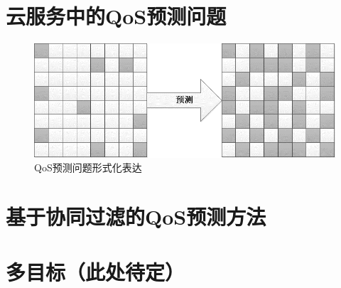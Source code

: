 		\section{云服务中的QoS预测问题}
		\label{sec_QoS_Prediction_in_the_Cloud}
		\begin{figure}[htb]
			\centering
			\includegraphics[scale=0.5]{fig/related_work/QoS_Prediction_Visualization.png}
			\caption{QoS预测问题形式化表达}
			\label{fig_QoS_Prediction_Visualization}
			\centering{}
		\end{figure}
		\section{基于协同过滤的QoS预测方法}
		\label{sec_QoS_Prediction_based_CF}
		
		\section{多目标（此处待定）}
		\label{sec_MultiObject}